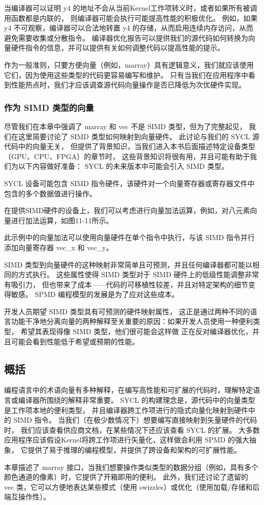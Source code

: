 当编译器可以证明 y4 的地址不会从当前Kernel工作项转义时，或者如果所有被调用函数都是内联的，
则编译器可能会执行可能提高性能的积极优化。 
例如，如果 y4 不可观察，编译器可以合法地转置 y4 的存储，从而启用连续内存访问，从而避免需要收集或分散指令。 
编译器优化报告可以提供我们的源代码如何转换为向量硬件指令的信息，并可以提供有关如何调整代码以提高性能的提示。

作为一般准则，只要方便向量（例如，marray）具有逻辑意义，我们就应该使用它们，因为使用这些类型的代码更容易编写和维护。 
只有当我们在应用程序中看到性能热点时，我们才应该调查源代码向量操作是否已降低为次优硬件实现。

\subsubsection{作为 SIMD 类型的向量}
尽管我们在本章中强调了 marray 和 vec 不是 SIMD 类型，但为了完整起见，
我们在这里简要讨论了 SIMD 类型如何映射到向量硬件。 
此讨论与我们的 SYCL 源代码中的向量无关，
但提供了背景知识，当我们进入本书后面描述特定设备类型（GPU、CPU、FPGA）的章节时，
这些背景知识将很有用，并且可能有助于我们为以下内容做好准备： SYCL 的未来版本中可能会引入 SIMD 类型。

SYCL 设备可能包含 SIMD 指令硬件，该硬件对一个向量寄存器或寄存器文件中包含的多个数据值进行操作。

在提供SIMD硬件的设备上，我们可以考虑进行向量加法运算，例如，对八元素向量进行加法运算，如图11-11所示。

此示例中的向量加法可以使用向量硬件在单个指令中执行，与该 SIMD 指令并行添加向量寄存器 vec\_x 和 vec\_y。

SIMD 类型到向量硬件的这种映射非常简单且可预测，并且任何编译器都可能以相同的方式执行。 
这些属性使得 SIMD 类型对于 SIMD 硬件上的低级性能调整非常有吸引力，
但也带来了成本——代码的可移植性较差，并且对特定架构的细节变得敏感。 SPMD 编程模型的发展是为了应对这些成本。

开发人员期望 SIMD 类型具有可预测的硬件映射属性，
这正是通过两种不同的语言功能干净地分离向量的两种解释至关重要的原因：如果开发人员使用一种便利类型，
希望其表现得像 SIMD 类型，他们很可能会这样做 正在反对编译器优化，并且可能会看到性能低于希望或预期的性能。

\subsection{概括}
编程语言中的术语向量有多种解释，在编写高性能和可扩展的代码时，理解特定语言或编译器所围绕的解释非常重要。 
SYCL 的构建理念是，源代码中的向量类型是工作项本地的便利类型，
并且编译器跨工作项进行的隐式向量化映射到硬件中的 SIMD 指令。 
当我们（在极少数情况下）想要编写直接映射到矢量硬件的代码时，
我们应该查看供应商文档，在某些情况下还应该查看 SYCL 的扩展。 
大多数应用程序应该假设Kernel将跨工作项进行矢量化，这样做会利用 SPMD 的强大抽象，
它提供了易于推理的编程模型，并提供了跨设备和架构的可扩展性能。

本章描述了 marray 接口，当我们想要操作类似类型的数据分组（例如，具有多个颜色通道的像素）时，它提供了开箱即用的便利。 
此外，我们还讨论了遗留的 vec 类，它可以方便地表达某些模式（使用 swizzles）或优化（使用加载/存储和后端互操作性）。